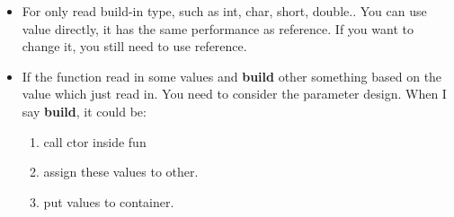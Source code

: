 \documentclass[a4paper,11pt,twoside]{book}
\begin{document}
\begin{itemize}
\item For only read build-in type, such as int, char, short, double.. You can use value directly, it has the same performance as reference. If you want to change it, you still need to use reference.

\item If the function read in some values and \textbf{build} other something based on the value which just read in. You need to consider the parameter design. When I say \textbf{build}, it could be:
\begin{enumerate}
	\item call ctor inside fun
	\item assign these values to other.
	\item put values to container.
\end{enumerate} 
\end{itemize}
\end{document}
